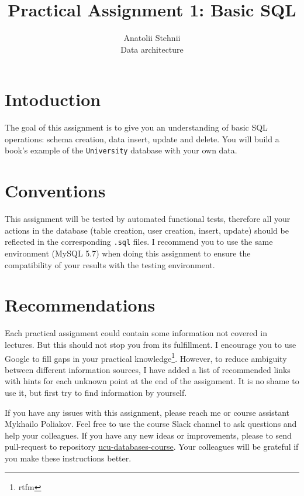 \documentclass[12pt]{article}
\newcommand{\code}[1]{\texttt{#1}}
\begin{document}
\title{Practical Assignment 1: Basic SQL}
\author{Anatolii Stehnii\\Data architecture}
\maketitle

\section*{Intoduction}
The goal of this assignment is to give you an understanding of basic SQL operations: schema creation, data insert, update and delete. You will build a book's example of the \code{University} database with your own data.

\section*{Conventions}

This assignment will be tested by automated functional tests, therefore all your  actions in the database (table creation, user creation, insert, update) should be reflected in the corresponding \code{.sql} files. I recommend you to use the same environment (MySQL 5.7) when doing this assignment to ensure the compatibility of your results with the testing environment.

\section*{Recommendations}

Each practical assignment could contain some information not covered in lectures. But this should not stop you from its fulfillment. I encourage you to use Google to fill gaps in your practical knowledge\footnote{rtfm}. However, to reduce ambiguity between different information sources, I have added a list of recommended links with hints for each unknown point at the end of the assignment. It is no shame to use it, but first try to find information by yourself.

If you have any issues with this assignment, please reach me or course assistant Mykhailo Poliakov. Feel free to use the course Slack channel to ask questions and help your colleagues. If you have any new ideas or improvements, please to send pull-request to repository \href{https://github.com/tsdaemon/ucu-databases-course}{ucu-databases-course}. Your colleagues will be grateful if you make these instructions better.
\end{document}
